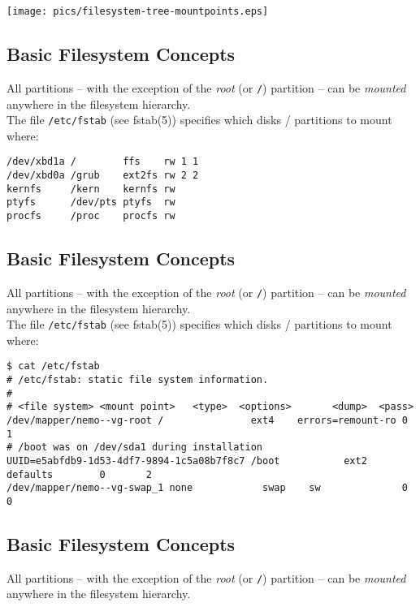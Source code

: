 \documentclass[xga]{xdvislides}
\begin{document}
\begin{center}
	\texttt{[image: pics/filesystem-tree-mountpoints.eps]} \\
\end{center}

\subsection{Basic Filesystem Concepts}
All partitions -- with the exception of the {\em root} (or \verb+/+) partition
-- can be {\em mounted} anywhere in the filesystem hierarchy.
\\

The file \verb+/etc/fstab+ (see fstab(5)) specifies which disks / partitions
to mount where:
\\
\begin{verbatim}
/dev/xbd1a /        ffs    rw 1 1
/dev/xbd0a /grub    ext2fs rw 2 2
kernfs     /kern    kernfs rw
ptyfs      /dev/pts ptyfs  rw
procfs     /proc    procfs rw
\end{verbatim}
\Normalsize

\subsection{Basic Filesystem Concepts}
All partitions -- with the exception of the {\em root} (or \verb+/+) partition
-- can be {\em mounted} anywhere in the filesystem hierarchy.
\\

The file \verb+/etc/fstab+ (see fstab(5)) specifies which disks / partitions
to mount where:
\\
\begin{verbatim}
$ cat /etc/fstab
# /etc/fstab: static file system information.
#
# <file system> <mount point>   <type>  <options>       <dump>  <pass>
/dev/mapper/nemo--vg-root /               ext4    errors=remount-ro 0       1
# /boot was on /dev/sda1 during installation
UUID=e5abfdb9-1d53-4df7-9894-1c5a08b7f8c7 /boot           ext2    defaults        0       2
/dev/mapper/nemo--vg-swap_1 none            swap    sw              0       0
\end{verbatim}


\subsection{Basic Filesystem Concepts}
All partitions -- with the exception of the {\em root} (or \verb+/+) partition
-- can be {\em mounted} anywhere in the filesystem hierarchy.
\\
\end{document}
